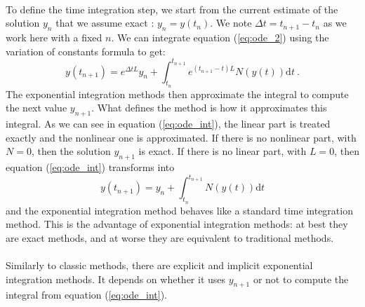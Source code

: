     \paragraph{}
    To define the time integration step, we start from the current estimate of the solution $y_n$ that we assume exact : $y_n = y\left(t_n\right)$.
    We note $\Delta t = t_{n+1} - t_n$ as we work here with a fixed $n$.
    We can integrate equation (\ref{eq:ode_2}) using the variation of constants formula to get:
    \begin{equation}\label{eq:ode_int}
      y\left(t_{n+1}\right) = e^{\Delta t L} y_n + \int_{t_n}^{t_{n+1}} e^{\left(t_{n+1} - t\right) L} N\left(y\left(t\right)\right) \mathrm{d}t \ .
    \end{equation}
    The exponential integration methods then approximate the integral to compute the next value $y_{n+1}$.
    What defines the method is how it approximates this integral.
    As we can see in equation (\ref{eq:ode_int}), the linear part is treated exactly and the nonlinear one is approximated.
    If there is no nonlinear part, with $N = 0$, then the solution $y_{n+1}$ is exact.
    If there is no linear part, with $L = 0$, then equation (\ref{eq:ode_int}) transforms into
    \begin{equation}\label{eq:ode_int_classic}
      y\left(t_{n+1}\right) = y_n + \int_{t_n}^{t_{n+1}} N\left(y\left(t\right)\right) \mathrm{d}t
    \end{equation}
    and the exponential integration method behaves like a standard time integration method.
    This is the advantage of exponential integration methods: at best they are exact methods, and at worse they are equivalent to traditional methods.

    \paragraph{}
    Similarly to classic methods, there are explicit \cite{BhattKhaliqWade2018} and implicit \cite{NieZhangZhao2006} exponential integration methods.
    It depends on whether it uses $y_{n+1}$ or not to compute the integral from equation (\ref{eq:ode_int}).

